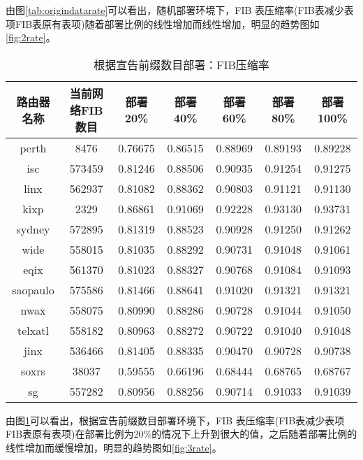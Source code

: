 由图\ref{tab:origindatarate}可以看出，随机部署环境下，FIB 表压缩率(FIB表减少表项\/FIB表原有表项)随着部署比例的线性增加而线性增加，明显的趋势图如\ref{fig:2rate}。

\begin{table}[h]
    \centering
    \caption{根据宣告前缀数目部署：FIB压缩率}
    \label{tab:prefixorigindatarate}
        \begin{tabular}{|c|c|c|c|c|c|c|}
            \hline
            路由器名称 & 当前网络FIB数目 & 部署20\% &部署40\% &部署60\% &部署80\% &部署100\% \\ \hline
            perth    & 8476   & 0.76675   & 0.86515   & 0.88969   & 0.89193   & 0.89228      \\ \hline
            isc      & 573459 & 0.81246 & 0.88506  & 0.90935 & 0.91254 & 0.91275    \\ \hline
            linx     & 562937 & 0.81082 & 0.88362 & 0.90803  & 0.91121 & 0.91130     \\ \hline
            kixp     & 2329   & 0.86861    & 0.91069    & 0.92228   & 0.93130   & 0.93731        \\ \hline
            sydney   & 572895 & 0.81319 & 0.88523  & 0.90928 & 0.91250 & 0.91262       \\ \hline
            wide     & 558015 & 0.81035 & 0.88292  & 0.90731 & 0.91048 & 0.91061        \\ \hline
            eqix     & 561370 & 0.81023 & 0.88327  & 0.90768 & 0.91084 & 0.91093         \\ \hline
            saopaulo & 575586 & 0.81466 & 0.88641  & 0.91020 & 0.91321 & 0.91321          \\ \hline
            nwax     & 558075 & 0.80990 & 0.88286  & 0.90728 & 0.91044 & 0.91050           \\ \hline
            telxatl  & 558182 & 0.80963 & 0.88272  & 0.90722 & 0.91040 & 0.91048            \\ \hline
            jinx     & 536466 & 0.81405  & 0.88335  & 0.90470 & 0.90728 & 0.90738             \\ \hline
            soxrs    & 38037  & 0.59555  & 0.66196  & 0.68444 & 0.68765 & 0.68767              \\ \hline
            sg       & 557282 & 0.80956 & 0.88256  & 0.90714 & 0.91033 & 0.91039               \\ \hline
        \end{tabular}
\end{table}

由图\ref{tab:prefixorigindatarate}可以看出，根据宣告前缀数目部署环境下，FIB 表压缩率(FIB表减少表项\/FIB表原有表项)在部署比例为20\%的情况下上升到很大的值，之后随着部署比例的线性增加而缓慢增加，明显的趋势图如\ref{fig:3rate}。

